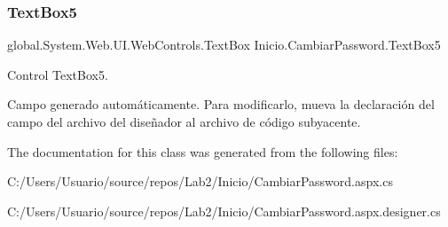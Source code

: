 \subsubsection{\texorpdfstring{TextBox5}{TextBox5}}
{\footnotesize\ttfamily global.\+System.\+Web.\+U\+I.\+Web\+Controls.\+Text\+Box Inicio.\+Cambiar\+Password.\+Text\+Box5\hspace{0.3cm}{\ttfamily [protected]}}



Control Text\+Box5. 

Campo generado automáticamente. Para modificarlo, mueva la declaración del campo del archivo del diseñador al archivo de código subyacente. 

The documentation for this class was generated from the following files\+:\begin{DoxyCompactItemize}
\item 
C\+:/\+Users/\+Usuario/source/repos/\+Lab2/\+Inicio/Cambiar\+Password.\+aspx.\+cs\item 
C\+:/\+Users/\+Usuario/source/repos/\+Lab2/\+Inicio/Cambiar\+Password.\+aspx.\+designer.\+cs\end{DoxyCompactItemize}
